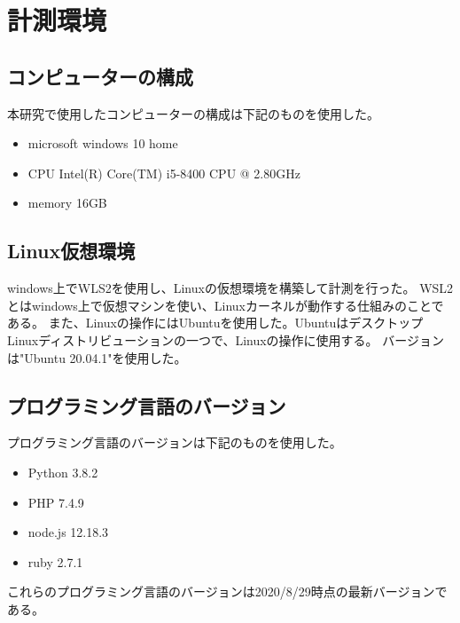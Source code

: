 \chapter{計測環境}
\label{cha:environment}
\section{コンピューターの構成}
本研究で使用したコンピューターの構成は下記のものを使用した。
\begin{itemize}
  \item microsoft windows 10 home
  \item CPU Intel(R) Core(TM) i5-8400 CPU @ 2.80GHz
  \item memory 16GB
\end{itemize}

\section{Linux仮想環境}
windows上でWLS2を使用し、Linuxの仮想環境を構築して計測を行った。
WSL2とはwindows上で仮想マシンを使い、Linuxカーネルが動作する仕組みのことである。
また、Linuxの操作にはUbuntu\cite{Ubuntu}を使用した。UbuntuはデスクトップLinuxディストリビューションの一つで、Linuxの操作に使用する。
バージョンは"Ubuntu 20.04.1"を使用した。

\section{プログラミング言語のバージョン}
プログラミング言語のバージョンは下記のものを使用した。
\begin{itemize}
  \item Python 3.8.2\cite{Python}
  \item PHP 7.4.9\cite{PHP}
　\item node.js 12.18.3\cite{node.js}
  \item ruby 2.7.1\cite{ruby}
\end{itemize}
これらのプログラミング言語のバージョンは2020/8/29時点の最新バージョンである。